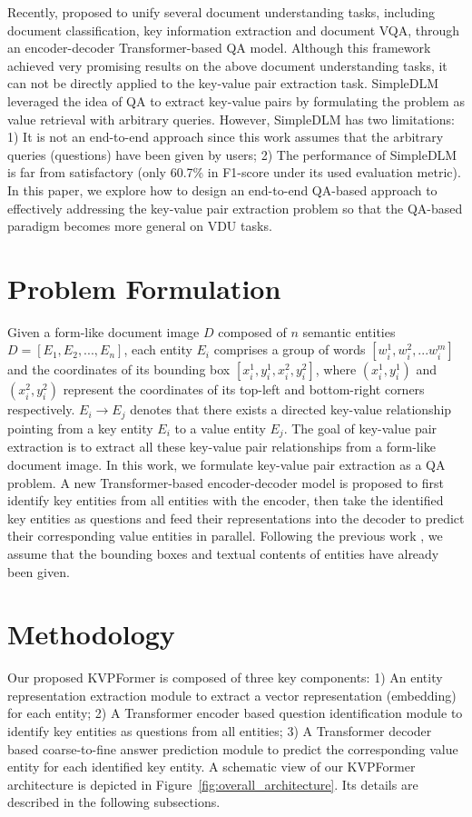 \documentclass[letterpaper]{article}
\def \Ours {KVPFormer}
\begin{document}
Recently, \cite{powalski2021going} proposed to unify several document understanding tasks, including document classification, key information extraction and document VQA, through an encoder-decoder Transformer-based QA model. Although this framework achieved very promising results on the above document understanding tasks, it can not be directly applied to the key-value pair extraction task. SimpleDLM \cite{gao2021value} leveraged the idea of QA to extract key-value pairs by formulating the problem as value retrieval with arbitrary queries. However, SimpleDLM has two limitations: 1) It is not an end-to-end approach since this work assumes that the arbitrary queries (questions) have been given by users; 2) The performance of SimpleDLM is far from satisfactory (only 60.7\% in F1-score under its used evaluation metric). In this paper, we explore how to design an end-to-end QA-based approach to effectively addressing the key-value pair extraction problem so that the QA-based paradigm becomes
more general on VDU tasks.

\section{Problem Formulation}
\label{sec:taskdefinition}
Given a form-like document image $D$ composed of $n$ semantic entities $D=[E_1, E_2, ..., E_n]$, each entity $E_i$ comprises a group of words $[w_i^1, w_i^2,...w_i^m]$ and the coordinates of its bounding box $[x_i^1, y_i^1, x_i^2, y_i^2]$, where $(x_i^1,y_i^1)$ and $(x_i^2,y_i^2)$ represent the coordinates of its top-left and bottom-right corners respectively. $E_i \rightarrow E_j$ denotes that there exists a directed key-value relationship pointing from a key entity $E_i$ to a value entity $E_j$. The goal of key-value pair extraction is to extract all these key-value pair relationships from a form-like document image. In this work, we formulate key-value pair extraction as a QA problem. A new Transformer-based encoder-decoder model is proposed to first identify key entities from all entities with the encoder, then take the identified key entities as questions and feed their representations into the decoder to predict their corresponding value entities in parallel. Following the previous work \cite{zhang2021entity}, we assume that the bounding boxes and textual contents of entities have already been given.

\section{Methodology}
\label{sec:methodology}
Our proposed \Ours{} is composed of three key components: 1) An entity representation extraction module to extract a vector representation (embedding) for each entity; 2) A Transformer encoder based question identification module to identify key entities as questions from all entities; 3) A Transformer decoder based coarse-to-fine answer prediction module to predict the corresponding value entity for each identified key entity. A schematic view of our \Ours{} architecture is depicted in Figure~\ref{fig:overall_architecture}. Its details are described in the following subsections.
\end{document}
